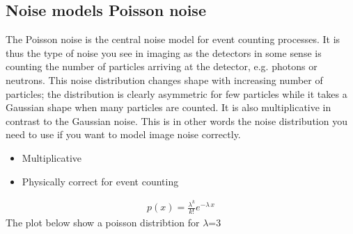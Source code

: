 \documentclass[letterpaper,10pt,english]{sphinxmanual}
\begin{document}
\subsection{Noise models \sphinxhyphen{} Poisson noise}
\label{\detokenize{02-ImageEnhancement:noise-models-poisson-noise}}
\sphinxAtStartPar
The Poisson noise is the central noise model for event counting processes. It is thus the type of noise you see in imaging as the detectors in some sense is counting the number of particles arriving at the detector, e.g. photons or neutrons. This noise distribution changes shape with increasing number of particles; the distribution is clearly asymmetric for few particles while it takes a Gaussian shape when many particles are counted. It is also multiplicative in contrast to the Gaussian noise. This is in other words the noise distribution you need to use if you want to model image noise correctly.
\begin{itemize}
\item {} 
\sphinxAtStartPar
Multiplicative

\item {} 
\sphinxAtStartPar
Physically correct for event counting

\end{itemize}

\sphinxAtStartPar
{}
\begin{equation*}
\begin{split}p(x)=\frac{\lambda^{k}}{k!} e^{-\lambda\,x}\end{split}
\end{equation*}
\sphinxAtStartPar
The plot below show a poisson distribtion for \(\lambda\)=3

\begin{sphinxVerbatim}[commandchars=\\\{\}]
   
    
                  
     
      
\end{sphinxVerbatim}
\end{document}
